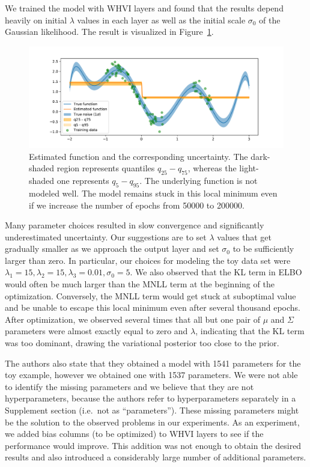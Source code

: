 \documentclass[11pt, twocolumn]{article}
\begin{document}
    We trained the model with WHVI layers and found that the results depend heavily on initial $\lambda$ values in each layer as well as the initial scale $\sigma_0$ of the Gaussian likelihood.
    The result is visualized in Figure~\ref{fig:toy-function-whvi}.
    \begin{figure}[htbp]
        \centering
        \includegraphics[width=1.0\hsize]{img/bayesian-fit-with-kl.pdf}
        \caption{
        Estimated function and the corresponding uncertainty.
        The dark-shaded region represents quantiles $q_{25}-q_{75}$, whereas the light-shaded one represents $q_{5}-q_{95}$.
        The underlying function is not modeled well.
        The model remains stuck in this local minimum even if we increase the number of epochs from 50000 to 200000.}
        \label{fig:toy-function-whvi}
    \end{figure}

    Many parameter choices resulted in slow convergence and significantly underestimated uncertainty.
    Our suggestions are to set $\lambda$ values that get gradually smaller as we approach the output layer and set $\sigma_0$ to be sufficiently larger than zero.
    In particular, our choices for modeling the toy data set were $\lambda_1=15, \lambda_2=15,\lambda_3=0.01, \sigma_0=5$.
    We also observed that the KL term in ELBO would often be much larger than the MNLL term at the beginning of the optimization. Conversely, the MNLL term would get stuck at suboptimal value and be unable to escape this local minimum even after several thousand epochs.
    After optimization, we observed several times that all but one pair of $\mu$ and $\Sigma$ parameters were almost exactly equal to zero and $\lambda$, indicating that the KL term was too dominant, drawing the variational posterior too close to the prior.

    The authors also state that they obtained a model with 1541 parameters for the toy example, however we obtained one with 1537 parameters.
    We were not able to identify the missing parameters and we believe that they are not hyperparameters, because the authors refer to hyperparameters separately in a Supplement section (i.e.\ not as ``parameters'').
    These missing parameters might be the solution to the observed problems in our experiments.
    As an experiment, we added bias columns (to be optimized) to WHVI layers to see if the performance would improve.
    This addition was not enough to obtain the desired results and also introduced a considerably large number of additional parameters.
\end{document}
